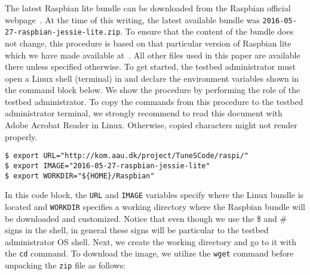 
The latest Raspbian lite bundle can be downloaded from the Raspbian
official webpage~\cite{raspbian}. At the time of this writing, the latest
available bundle was \texttt{2016-05-27-raspbian-jessie-lite.zip}.
To ensure that the content of the bundle does not change, this procedure
is based on that particular version of Raspbian lite which we have
made available at~\cite{tunescode_webpage}. All other files used in this paper
are available there unless specified otherwise. To get started, the testbed
administrator must open a Linux shell (terminal) in and declare the environment
variables shown in the command block below. We show the procedure by
performing the role of the testbed administrator. To copy the commands from
this procedure to the testbed administrator terminal,
we strongly recommend to read this document with Adobe Acrobat Reader in Linux.
Otherwise, copied characters might not render properly.



\begin{lstlisting}[]
$ export URL="http://kom.aau.dk/project/TuneSCode/raspi/"
$ export IMAGE="2016-05-27-raspbian-jessie-lite"
$ export WORKDIR="${HOME}/Raspbian"
\end{lstlisting}
\FloatBarrier
\vspace{-5mm}

In this code block, the \texttt{URL} and \texttt{IMAGE} variables specify where
the Linux bundle is located and \texttt{WORKDIR} specifies a working
directory where the Raspbian bundle will be downloaded and customized.
Notice that even though we use the \$ and \# signs in the shell, in general
these signs will be particular to the testbed administrator \ac{OS} shell.
Next, we create the working directory and go to it with the \texttt{cd}
command. To download the image, we utilize the \texttt{wget} command before
unpacking the \texttt{zip} file as follows:


